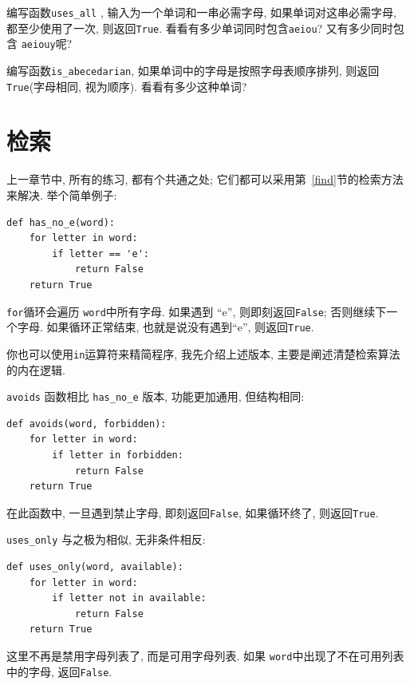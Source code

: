 \documentclass[10pt]{book}
\begin{document}
\begin{exercise} 

编写函数\verb"uses_all" , 输入为一个单词和一串必需字母, 
如果单词对这串必需字母, 都至少使用了一次, 则返回{\tt True}. 
看看有多少单词同时包含{\tt aeiou}? 又有多少同时包含 {\tt aeiouy}呢?

\end{exercise}


\begin{exercise}
编写函数\verb"is_abecedarian", 如果单词中的字母是按照字母表顺序排列, 
则返回 {\tt True}(字母相同, 视为顺序). 看看有多少这种单词?


\end{exercise}


\section{检索}
\label{search}

上一章节中, 所有的练习, 都有个共通之处;
它们都可以采用第~\ref{find}节的检索方法来解决. 
举个简单例子:

\begin{verbatim}
def has_no_e(word):
    for letter in word:
        if letter == 'e':
            return False
    return True
\end{verbatim}
%
{\tt for}循环会遍历 {\tt word}中所有字母. 
如果遇到 ``e'', 则即刻返回{\tt False};
否则继续下一个字母. 
如果循环正常结束, 也就是说没有遇到``e'',  则返回{\tt True}.

你也可以使用{\tt in}运算符来精简程序, 
我先介绍上述版本, 主要是阐述清楚检索算法的内在逻辑. 

{\tt avoids} 函数相比 \verb"has_no_e" 版本, 功能更加通用, 
但结构相同:

\begin{verbatim}
def avoids(word, forbidden):
    for letter in word:
        if letter in forbidden:
            return False
    return True
\end{verbatim}
%
在此函数中, 一旦遇到禁止字母, 即刻返回{\tt False}, 
如果循环终了, 则返回{\tt True}. 

\verb"uses_only" 与之极为相似, 无非条件相反:

\begin{verbatim}
def uses_only(word, available):
    for letter in word: 
        if letter not in available:
            return False
    return True
\end{verbatim}
%
这里不再是禁用字母列表了, 而是可用字母列表. 
如果 {\tt word}中出现了不在可用列表中的字母, 返回{\tt False}.
\end{document}
